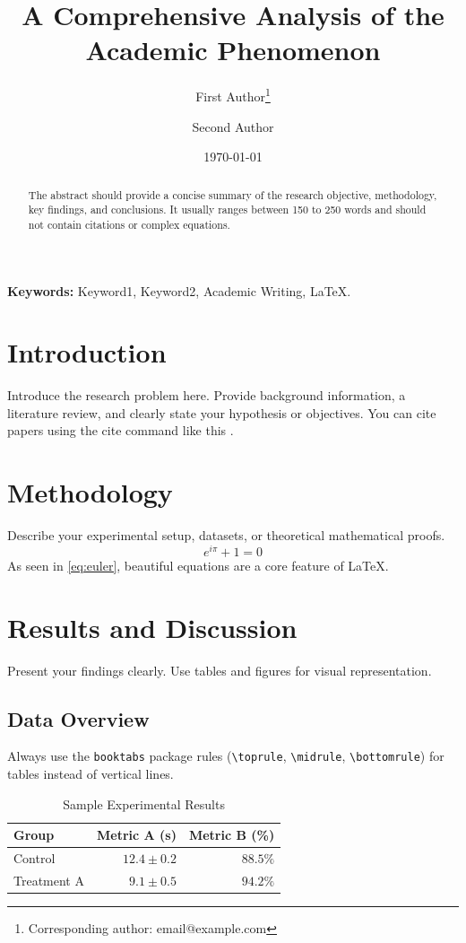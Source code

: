 \documentclass[11pt, letterpaper]{article}
\title{\LARGE \textbf{A Comprehensive Analysis of the Academic Phenomenon}}
\author[1]{First Author\thanks{Corresponding author: email@example.com}}
\author[2]{Second Author}
\affil[1]{Department of Science, University of Examples}
\affil[2]{Research Lab, Global Institute}
\date{\small \today}
\begin{document}
\maketitle

\begin{abstract}
The abstract should provide a concise summary of the research objective, methodology, key findings, and conclusions. It usually ranges between 150 to 250 words and should not contain citations or complex equations.
\end{abstract}

\noindent \textbf{Keywords:} Keyword1, Keyword2, Academic Writing, LaTeX.

\section{Introduction}
Introduce the research problem here. Provide background information, a literature review, and clearly state your hypothesis or objectives.
You can cite papers using the cite command like this \cite{example_citation}.

\section{Methodology}
Describe your experimental setup, datasets, or theoretical mathematical proofs.
\begin{equation}\label{eq:euler}
    e^{i\pi} + 1 = 0
\end{equation}
As seen in \cref{eq:euler}, beautiful equations are a core feature of LaTeX.

\section{Results and Discussion}
Present your findings clearly. Use tables and figures for visual representation.

\subsection{Data Overview}
Always use the \texttt{booktabs} package rules (\texttt{\textbackslash toprule}, \texttt{\textbackslash midrule}, \texttt{\textbackslash bottomrule}) for tables instead of vertical lines.

\begin{table}[htbp]
\centering
\caption{Sample Experimental Results}
\label{tab:results}
\begin{tabular}{lrr}
\toprule
\textbf{Group} & \textbf{Metric A (s)} & \textbf{Metric B (\%)} \\
\midrule
Control        & $12.4 \pm 0.2$        & $88.5\%$               \\
Treatment A    & $9.1 \pm 0.5$         & $94.2\%$               \\
\bottomrule
\end{tabular}
\end{table}
\end{document}
